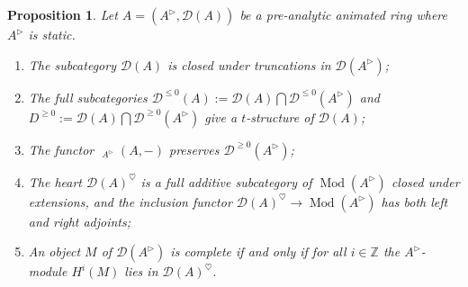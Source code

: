 \documentclass{article}
\theoremstyle{plain}
\newtheorem{prop}[thm]{Proposition}
\theoremstyle{definition}
\theoremstyle{remark}
\DeclareMathOperator{\Homs}{\underline{Hom}}
\DeclareMathOperator{\modcat}{Mod}
\newcommand{\huflag}{\triangleright}
\newcommand{\D}{\mathcal{D}}
\newcommand{\heart}{\heartsuit}
\begin{document}
\begin{prop}
Let $ A = (A ^{\huflag}, \D (A)) $ be a pre-analytic animated ring where $ A ^{\huflag} $ is static.
\begin{enumerate}
\item The subcategory $ \D (A) $ is closed under truncations in $ \D (A ^{\huflag}) $;
\item The full subcategories $ \D ^{\leq 0}(A) := \D (A) \bigcap \D ^{\leq 0}(A ^{\huflag}) $ and $ D ^{\geq 0} := \D (A) \bigcap \D ^{\geq 0} (A ^{\huflag}) $
give a $ t $-structure of $ \D (A) $;
\item The functor $ \Homs _{A ^{\huflag}}(A, -) $ preserves $ \D ^{\geq 0}(A ^{\huflag}) $;
\item The heart $ \D (A)^{\heart} $ is a full additive subcategory of $ \modcat (A ^{\huflag}) $ closed under extensions,
and the inclusion functor $ \D (A)^{\heart}\to \modcat (A ^{\huflag}) $ has both left and right adjoints;
\item An object $ M $ of $ \D (A ^{\huflag}) $ is complete if and only if for all $ i\in \mathbb{Z} $ the $ A ^{\huflag} $-module
$ H ^{i}(M) $ lies in $ \D (A)^{\heart} $.
\end{enumerate}
\label{definition::tstr}
\end{prop}
\end{document}
